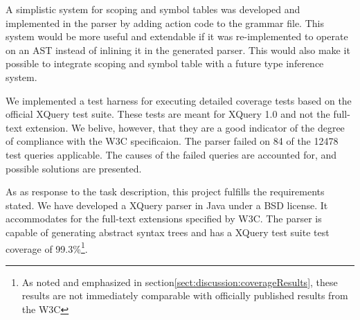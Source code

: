 A simplistic system for scoping and symbol tables was developed and implemented in the parser by adding action code to the grammar file. This system would be more useful and extendable if it was re-implemented to operate on an AST instead of inlining it in the generated parser. This would also make it possible to integrate scoping and symbol table with a future type inference system.

We implemented a test harness for executing detailed coverage tests based on the official XQuery test suite\cite{w3c05}. These tests are meant for XQuery 1.0 and not the full-text extension. We belive, however, that they are a good indicator of the degree of compliance with the W3C specificaion. The parser failed on 84 of the 12478 test queries applicable. The causes of the failed queries are accounted for, and possible solutions are presented.

As as response to the task description, this project fulfills the requirements stated. We have developed a XQuery parser in Java under a BSD license. It accommodates for the full-text extensions specified by W3C. The parser is capable of generating abstract syntax trees and has a XQuery test suite test coverage of 99.3\%\footnote{As noted and emphasized in section\ref{sect:discussion:coverageResults}, these results are not immediately comparable with officially published results from the W3C}.
